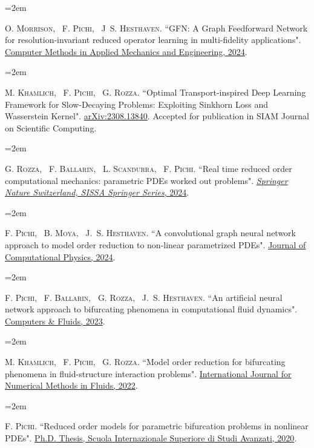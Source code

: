 \documentclass[
  usegeometry%
]{scrartcl}
\newcommand{\MarginText}[1]{\marginpar{\raggedleft\itshape\small#1}} %
\newcommand{\Description}[1]{\hangindent=2em\hangafter=0\noindent\raggedright\footnotesize{#1}\par\normalsize\vspace{1em}} %
\begin{document}
\begin{cv}{}
\Description{\MarginText{[11]}O. \textsc{Morrison}, ~F. \textsc{Pichi}, ~J~S. \textsc{Hesthaven.}  {\color{blue} ``GFN: A Graph Feedforward Network for resolution-invariant reduced operator learning in multi-fidelity applications".} \href{https://doi.org/10.1016/j.cma.2024.117458}{Computer Methods in Applied Mechanics and Engineering, 2024}.}

\Description{\MarginText{[10]}M. \textsc{Khamlich}, ~F. \textsc{Pichi}, ~G. \textsc{Rozza.} {\color{blue} ``Optimal Transport-inspired Deep Learning Framework for Slow-Decaying Problems: Exploiting Sinkhorn Loss and Wasserstein Kernel".} \href{https://arxiv.org/abs/2308.13840}{ arXiv:2308.13840}. Accepted for publication in SIAM Journal on Scientific Computing.}

\Description{\MarginText{[9]}G. \textsc{Rozza}, ~F. \textsc{Ballarin}, ~L. \textsc{Scandurra}, ~F. \textsc{Pichi.} {\color{blue} ``Real time reduced order computational mechanics: parametric PDEs worked out problems".} \href{https://doi.org/10.1007/978-3-031-49892-3}{\textit{Springer Nature Switzerland, SISSA Springer Series}, 2024}.}

\Description{\MarginText{[8]}F. \textsc{Pichi}, ~B. \textsc{Moya}, ~J.~S. \textsc{Hesthaven.} {\color{blue} ``A convolutional graph neural network approach to model order reduction to non-linear parametrized PDEs".} \href{https://www.sciencedirect.com/science/article/pii/S0021999124000111}{Journal of Computational Physics, 2024}.}

\newpage
\Description{\MarginText{[7]}F. \textsc{Pichi}, ~F. \textsc{Ballarin}, ~G. \textsc{Rozza}, ~J.~S. \textsc{Hesthaven.} {\color{blue} ``An artificial neural network approach to bifurcating phenomena in computational fluid dynamics".} \href{https://doi.org/10.1016/j.compfluid.2023.105813}{Computers \& Fluids, 2023}.}


\Description{\MarginText{[6]}M. \textsc{Khamlich}, ~F. \textsc{Pichi}, ~G. \textsc{Rozza.} {\color{blue} ``Model order reduction for bifurcating phenomena in fluid-structure interaction problems".} \href{https://onlinelibrary.wiley.com/doi/abs/10.1002/fld.5118}{International Journal for Numerical Methods in Fluids, 2022}.}


\Description{\MarginText{[5]}F. \textsc{Pichi.} {\color{blue} ``Reduced order models for parametric bifurcation
problems in nonlinear {PDE}s".} \href{https://iris.sissa.it/handle/20.500.11767/114329}{Ph.D. Thesis, Scuola Internazionale Superiore di Studi Avanzati, 2020}.}



\end{cv}
\end{document}
